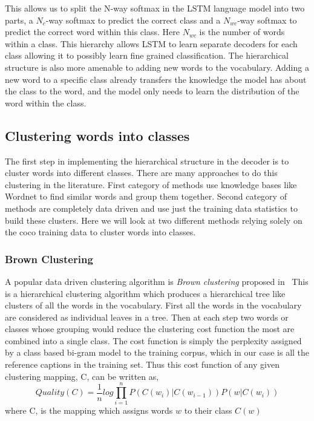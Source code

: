 This allows us to split the N-way softmax in the LSTM language model into two
parts, a $N_c$-way softmax to predict the correct class and a $N_{wc}$-way
softmax to predict the correct word within this class.
Here $N_{wc}$ is the number of words within a class.
This hierarchy allows LSTM to learn separate decoders for each class allowing it to
possibly learn fine grained classification.
The hierarchical structure is also more amenable to adding new words to the vocabulary.
Adding a new word to a specific class already transfers the knowledge the model
has about the class to the word, and the model only needs to learn the
distribution of the word within the class.

\subsection{Clustering words into classes}
The first step in implementing the hierarchical structure in the decoder is to
cluster words into different classes.
There are many approaches to do this clustering in the literature.
First category of methods use knowledge bases like Wordnet to find similar words
and group them together.
Second category of methods are completely data driven and use just the training
data statistics to build these clusters.
Here we will look at two different methods relying solely on the coco training
data to cluster words into classes.

\subsubsection*{Brown Clustering}
A popular data driven clustering algorithm is \emph{Brown clustering} proposed
in~\cite{BrownClust}
This is a hierarchical clustering algorithm which produces a hierarchical tree
like clusters of all the words in the vocabulary.
First all the words in the vocabulary are considered as individual leaves in a
tree. 
Then at each step two words or classes whose grouping would reduce the clustering
cost function the most are combined into a single class.
The cost function is simply the perplexity assigned by a class based bi-gram
model to the training corpus, which in our case is all the reference captions in
the training set.
Thus this cost function of any given clustering mapping, C, can be written as,
\begin{equation}
  \label{eq:brown} 
        Quality(C) = \frac{1}{n} log \prod_{i=1}^{n} P(C(w_i)|C(w_{i-1})) P(w|C(w_i))
\end{equation}
\noindent where C, is the mapping which assigns words $w$ to their class $C(w)$

